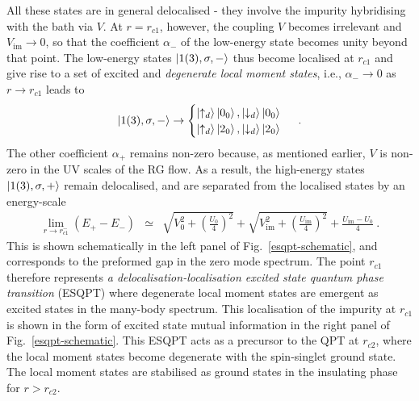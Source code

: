 All these states are in general delocalised - they involve the impurity hybridising with the bath via \(V\). At \(r = r_{c1}\), however, the coupling \(V\) becomes irrelevant and \(V_\text{im} \to 0\), so that the coefficient \(\alpha_-\) of the low-energy state becomes unity beyond that point. The low-energy states \(\ket{1(3),\sigma,-}\) thus become localised at \(r_{c1}\) and give rise to a set of excited and {\it degenerate local moment states}, i.e., $\alpha_- \to 0$ as $r \to r_{c1}$ leads to
\begin{eqnarray}
\ket{1(3),\sigma,-} \to \begin{cases}
	\ket{\uparrow_d}\ket{0_0}, \ket{\downarrow_d}\ket{0_0}\\
	\ket{\uparrow_d}\ket{2_0}, \ket{\downarrow_d}\ket{2_0}\\
\end{cases}~.
\end{eqnarray}
The other coefficient \(\alpha_+\) remains non-zero because, as mentioned earlier, \(V\) is non-zero in the UV scales of the RG flow. As a result, the high-energy states \(\ket{1(3),\sigma,+}\) remain delocalised, and are separated from the localised states by an energy-scale
\begin{eqnarray}
\lim_{r \to r_{c1}^-} \left(E_+ - E_-\right) &\simeq & \sqrt{V_0^2 + \left(\frac{U_0}{4}\right)^2} + \sqrt{V_{\text{im}}^2 + \left(\frac{U_{\text{im}}}{4}\right)^2} + \frac{U_{\text{im}}-U_0}{4}~.
\end{eqnarray}
This is shown schematically in the left panel of Fig.~\eqref{esqpt-schematic}, and corresponds to the preformed gap in the zero mode spectrum. The point \(r_{c1}\) therefore represents {\it a delocalisation-localisation excited state quantum phase transition} (ESQPT) where degenerate local moment states are emergent as excited states in the many-body spectrum. This localisation of the impurity at $r_{c1}$ is shown in the form of excited state mutual information in the right panel of Fig.~\eqref{esqpt-schematic}. This ESQPT acts as a precursor to the QPT at $r_{c2}$, where the local moment states become degenerate with the spin-singlet ground state. The local moment states are stabilised as ground states in the insulating phase for $r>r_{c2}$. 

